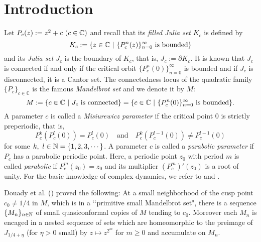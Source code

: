 \section{Introduction}

Let $P_c(z) := z^2 +c \ (c \in \mathbb C)$ and recall that its 
{\it filled Julia set} $K_c$ is defined by
$$
  K_c := \{ z \in \mathbb C \ | \ \{ P_c^n(z) \}_{n=0}^\infty \ \text{is bounded} \}
$$
and its {\it Julia set} $J_c$ is the boundary of $K_c$, that is, 
$J_c := \partial K_c$. It is known that $J_c$ is connected if and
only if the critical orbit $\{ P_c^n(0) \}_{n=0}^\infty$ is bounded
and if $J_c$ is disconnected, it is a Cantor set. The connectedness locus
of the quadratic family $\{ P_c \}_{c \in \mathbb C}$ is the famous 
{\it Mandelbrot set} and we denote it by $M$:
$$
M := \{ c \in \mathbb C \ | \ J_c \  \text{is connected} \} 
= \{ c \in \mathbb C \ | \ \{ P_c^n(0) \}_{n=0}^\infty  \  \text{is bounded} \}.
$$
A parameter $c$ is called a {\it Misiurewicz parameter} if the 
critical point $0$ is strictly preperiodic, that is,  
$$
  P_c^k(P_c^l(0)) = P_c^l(0) \quad \text{and} \quad 
  P_c^k(P_c^{l-1}(0)) \ne P_c^{l-1}(0)
$$
for some $k, \ l \in \mathbb N = \{ 1,2,3,\cdots \}$. A parameter $c$ is called a 
{\it parabolic parameter}
if $P_c$ has a parabolic periodic point. Here, a periodic point $z_0$ with 
period $m$ is called {\it parabolic} if $P_c^m(z_0) = z_0$ and its multiplier
$(P_c^m)'(z_0)$ is a root of unity. For the basic knowledge of complex dynamics,
we refer to \cite{Beardon 1991} and \cite{Milnor 2006}.


Douady et al. (\cite{Douady 2000}) proved the following: At a small neighborhood
of the cusp point $c_0 \ne 1/4$ in $M$, which is in a \lq\lq primitive
small Mandelbrot set", there is a sequence $\{ M_n \}_{n \in \mathbb N}$ of
small quasiconformal copies of $M$ tending to $c_0$. Moreover each $M_n$ is
encaged in a nested sequence of sets which are homeomorphic to the preimage
of $J_{1/4 + \eta}$ (for $\eta > 0$ small) by $z \mapsto z^{2^m}$ for 
$m \geq 0$ and accumulate on $M_n$. 

